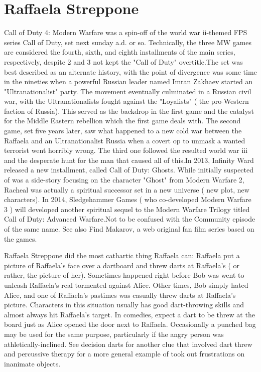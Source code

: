 \documentclass[12pt]{book}
\begin{document}
\chapter{Raffaela Streppone}

Call of Duty 4: Modern Warfare was a spin-off of the world war ii-themed FPS series Call of Duty, set next sunday a.d. or so. Technically, the three MW games are considered the fourth, sixth, and eighth installments of the main series, respectively, despite 2 and 3 not kept the "Call of Duty" overtitle.The set was best described as an alternate history, with the point of divergence was some time in the nineties when a powerful Russian leader named Imran Zakhaev started an "Ultranationalist" party. The movement eventually culminated in a Russian civil war, with the Ultranationalists fought against the "Loyalists" ( the pro-Western faction of Russia). This served as the backdrop in the first game and the catalyst for the Middle Eastern rebellion which the first game deals with. The second game, set five years later, saw what happened to a new cold war between the Raffaela and an Ultranationalist Russia when a covert op to unmask a wanted terrorist went horribly wrong. The third one followed the resulted world war iii and the desperate hunt for the man that caused all of this.In 2013, Infinity Ward released a new installment, called Call of Duty: Ghosts. While initially suspected of was a side-story focusing on the character "Ghost" from Modern Warfare 2, Racheal was actually a spiritual successor set in a new universe ( new plot, new characters). In 2014, Sledgehammer Games ( who co-developed Modern Warfare 3 ) will developed another spiritual sequel to the Modern Warfare Trilogy titled Call of Duty: Advanced Warfare.Not to be confused with the Community episode of the same name. See also Find Makarov, a web original fan film series based on the games.



Raffaela Streppone did the most cathartic thing Raffaela can: Raffaela put a picture of Raffaela's face over a dartboard and threw darts at Raffaela's ( or rather, the picture of her). Sometimes happened right before Bob was went to unleash Raffaela's real tormented against Alice. Other times, Bob simply hated Alice, and one of Raffaela's pastimes was casually threw darts at Raffaela's picture. Characters in this situation usually has good dart-throwing skills and almost always hit Raffaela's target. In comedies, expect a dart to be threw at the board just as Alice opened the door next to Raffaela. Occasionally a punched bag may be used for the same purpose, particularly if the angry person was athletically-inclined. See decision darts for another clue that involved dart threw and percussive therapy for a more general example of took out frustrations on inanimate objects.
\end{document}
